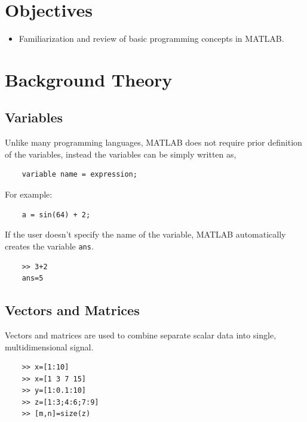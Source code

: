 \documentclass{lab_sheet}
\begin{document}
\section{Objectives}
\begin{itemize}
    \item Familiarization and review of basic programming concepts in MATLAB.
\end{itemize}
\section{Background Theory}
\subsection{Variables}
Unlike many programming languages, MATLAB does not require prior definition of the variables, instead the variables can be simply written as,
\begin{verbatim}
    variable name = expression;
\end{verbatim}
For example:
\begin{verbatim}
    a = sin(64) + 2;
\end{verbatim}
If the user doesn't specify the name of the variable, MATLAB automatically creates the
variable \texttt{ans}.   
\begin{verbatim}
    >> 3+2
    ans=5
\end{verbatim}
\subsection{Vectors and Matrices}
Vectors and matrices are used to combine separate scalar data into single, multidimensional signal.
\begin{verbatim}
    >> x=[1:10]
    >> x=[1 3 7 15]
    >> y=[1:0.1:10]
    >> z=[1:3;4:6;7:9]
    >> [m,n]=size(z)
\end{verbatim}
\end{document}
